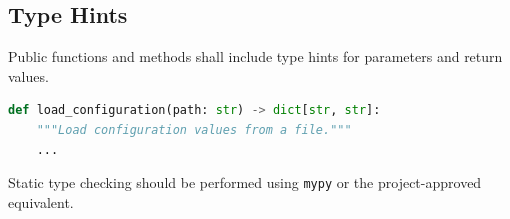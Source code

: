\subsection{Type Hints}

Public functions and methods shall include type hints for parameters and
return values.

\begin{lstlisting}[language=Python]
def load_configuration(path: str) -> dict[str, str]:
    """Load configuration values from a file."""
    ...
\end{lstlisting}

Static type checking should be performed using \texttt{mypy} or the
project-approved equivalent.
